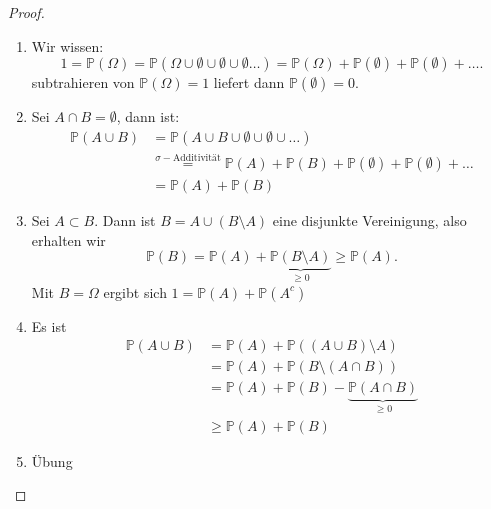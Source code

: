 \begin{proof}
    \begin{enumerate}[label=\protect\circled{\alph*}]
        \item Wir wissen:
            \[
                1= \mathbb{P}(\Omega) = \mathbb{P}\left( \Omega \cup \emptyset \cup \emptyset \cup \emptyset \ldots  \right)  = \mathbb{P}(\Omega) + \mathbb{P}(\emptyset) + \mathbb{P}(\emptyset) + \ldots
            .\] 
            subtrahieren von $\mathbb{P}(\Omega) =1$ liefert dann $\mathbb{P}(\emptyset) = 0$.
        \item Sei $A \cap B = \emptyset$, dann ist:
            \begin{equation*}
                \begin{split}
                    \mathbb{P}(A\cup B ) &= \mathbb{P}(A \cup B \cup \emptyset \cup \emptyset \cup \ldots) \\
                                         &\stackrel{σ-\text{Additivität}}{=} \mathbb{P}(A) + \mathbb{P}(B) + \mathbb{P}(\emptyset) + \mathbb{P}(\emptyset) + \ldots \\
                                         &= \mathbb{P}(A) + \mathbb{P}(B)
                \end{split}
            \end{equation*}
        \item Sei $A\subset B$. Dann ist $B = A \cup (B \setminus A)$ eine disjunkte Vereinigung, also erhalten wir
            \[
                \mathbb{P}(B) = \mathbb{P}(A) + \underbrace{\mathbb{P}(B \setminus A)}_{\geq 0} \geq  \mathbb{P}(A)
            .\] 
            Mit $B = \Omega$ ergibt sich  $1 = \mathbb{P}(A) + \mathbb{P}(A^{c})$
        \item Es ist
            \begin{equation}
                \begin{split}
                    \mathbb{P}(A \cup B) &= \mathbb{P}(A) + \mathbb{P}((A \cup B) \setminus A)  \\
                                         &= \mathbb{P}(A) + \mathbb{P}(B \setminus (A \cap B)) \\
                                         &= \mathbb{P}(A) + \mathbb{P}(B) - \underbrace{\mathbb{P}(A \cap B)}_{\geq 0} \\
                                         &\geq \mathbb{P}(A) + \mathbb{P}(B)
                \end{split}
            \end{equation}
        \item Übung
    \end{enumerate}
\end{proof}
